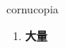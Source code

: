 
\begin{frame}
{\huge cornucopia}
\begin{center}
\begin{enumerate}\Large
  \item \textbf{大量}
\end{enumerate}
\end{center}
\end{frame}

